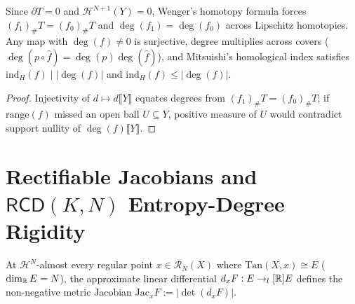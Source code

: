 \begin{theorem}
\label{thm_wenger_homotopy_surjectivity}
\leanok
{}
Since $\partial T = 0$ and $\mathcal{H}^{N+1}(Y) = 0$, Wenger's homotopy formula forces $(f_1)_\# T = (f_0)_\# T$ and $\deg(f_1) = \deg(f_0)$ across Lipschitz homotopies. Any map with $\deg(f) \ne 0$ is surjective, degree multiplies across covers ($\deg(p \circ \hat{f}) = \deg(p)\deg(\hat{f})$), and Mitsuishi's homological index satisfies $\mathrm{ind}_H(f) \mid |\deg(f)|$ and $\mathrm{ind}_H(f) \le |\deg(f)|$.
\end{theorem}
\begin{proof}\leanok Injectivity of $d \mapsto d\llbracket Y \rrbracket$ equates degrees from $(f_1)_\# T = (f_0)_\# T$; if $\mathrm{range}(f)$ missed an open ball $U \subseteq Y$, positive measure of $U$ would contradict support nullity of $\deg(f)\llbracket Y \rrbracket$.\end{proof}

\chapter{Rectifiable Jacobians and $\mathsf{RCD}(K, N)$ Entropy-Degree Rigidity}

\begin{definition}
\label{def_metric_jacobian}
\leanok
{}
At $\mathcal{H}^N$-almost every regular point $x \in \mathcal{R}_N(X)$ where $\mathrm{Tan}(X, x) \cong E$ ($\dim_{\mathbb{R}} E = N$), the approximate linear differential $d_x F : E \to_l[\mathbb{R}] E$ defines the non-negative metric Jacobian $\mathrm{Jac}_x F := |\det(d_x F)|$.
\end{definition}

